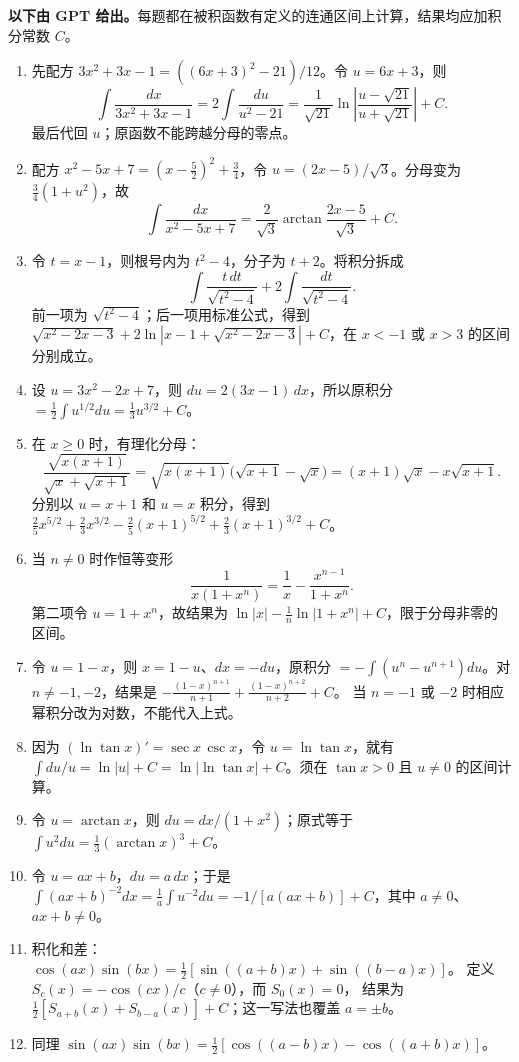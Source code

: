 \documentclass[UTF8,11pt, a4paper, oneside, fontset=none]{ctexbook}
\begin{document}
\noindent\textbf{以下由 GPT 给出。}每题都在被积函数有定义的连通区间上计算，结果均应加积分常数 $C$。
\begin{enumerate}
\item 先配方 $3x^2+3x-1=((6x+3)^2-21)/12$。令 $u=6x+3$，则
\[
\int\frac{dx}{3x^2+3x-1}
=2\int\frac{du}{u^2-21}
=\frac1{\sqrt{21}}\ln\left|\frac{u-\sqrt{21}}{u+\sqrt{21}}\right|+C.
\]
最后代回 $u$；原函数不能跨越分母的零点。
\item 配方 $x^2-5x+7=(x-\tfrac52)^2+\tfrac34$，令 $u=(2x-5)/\sqrt3$。分母变为 $\tfrac34(1+u^2)$，故
\[
\int\frac{dx}{x^2-5x+7}
=\frac2{\sqrt3}\arctan\frac{2x-5}{\sqrt3}+C.
\]
\item 令 $t=x-1$，则根号内为 $t^2-4$，分子为 $t+2$。将积分拆成
\[
\int\frac{t\,dt}{\sqrt{t^2-4}}+2\int\frac{dt}{\sqrt{t^2-4}}.
\]
前一项为 $\sqrt{t^2-4}$；后一项用标准公式，得到
$\sqrt{x^2-2x-3}+2\ln|x-1+\sqrt{x^2-2x-3}|+C$，在 $x<-1$ 或 $x>3$ 的区间分别成立。
\item 设 $u=3x^2-2x+7$，则 $du=2(3x-1)\,dx$，所以原积分
$=\frac12\int u^{1/2}du=\frac13u^{3/2}+C$。
\item 在 $x\ge0$ 时，有理化分母：
\[
\frac{\sqrt{x(x+1)}}{\sqrt x+\sqrt{x+1}}
=\sqrt{x(x+1)}\bigl(\sqrt{x+1}-\sqrt x\bigr)
=(x+1)\sqrt x-x\sqrt{x+1}.
\]
分别以 $u=x+1$ 和 $u=x$ 积分，得到
$\frac25x^{5/2}+\frac23x^{3/2}-\frac25(x+1)^{5/2}+\frac23(x+1)^{3/2}+C$。
\item 当 $n\ne0$ 时作恒等变形
\[
\frac1{x(1+x^n)}=\frac1x-\frac{x^{n-1}}{1+x^n}.
\]
第二项令 $u=1+x^n$，故结果为
$\ln|x|-\frac1n\ln|1+x^n|+C$，限于分母非零的区间。
\item 令 $u=1-x$，则 $x=1-u$、$dx=-du$，原积分
$=-\int(u^n-u^{n+1})du$。对 $n\ne-1,-2$，结果是
$-\frac{(1-x)^{n+1}}{n+1}+\frac{(1-x)^{n+2}}{n+2}+C$。
当 $n=-1$ 或 $-2$ 时相应幂积分改为对数，不能代入上式。
\item 因为 $(\ln\tan x)'=\sec x\,\csc x$，令 $u=\ln\tan x$，就有
$\int du/u=\ln|u|+C=\ln|\ln\tan x|+C$。须在 $\tan x>0$ 且 $u\ne0$ 的区间计算。
\item 令 $u=\arctan x$，则 $du=dx/(1+x^2)$；原式等于
$\int u^2du=\frac13(\arctan x)^3+C$。
\item 令 $u=ax+b$，$du=a\,dx$；于是
$\int (ax+b)^{-2}dx=\frac1a\int u^{-2}du=-1/[a(ax+b)]+C$，其中 $a\ne0$、$ax+b\ne0$。
\item 积化和差：
$\cos(ax)\sin(bx)=\tfrac12[\sin((a+b)x)+\sin((b-a)x)]$。
定义 $S_c(x)=-\cos(cx)/c$（$c\ne0$），而 $S_0(x)=0$，
结果为 $\tfrac12[S_{a+b}(x)+S_{b-a}(x)]+C$；这一写法也覆盖 $a=\pm b$。
\item 同理
$\sin(ax)\sin(bx)=\tfrac12[\cos((a-b)x)-\cos((a+b)x)]$。

\end{enumerate}
\end{document}
